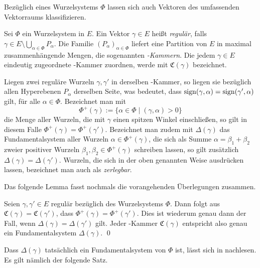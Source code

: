 Bezüglich eines Wurzelsystems $\Phi$ lassen sich auch Vektoren des umfassenden Vektorraums klassifizieren.

\begin{defn}
  Sei $\Phi$ ein Wurzelsystem in $E$.
  Ein Vektor $\gamma \in E$ heißt \emph{regulär}, falls $\gamma \in E \setminus \bigcup_{\alpha \in \Phi} P_\alpha$.
  Die Familie $(P_\alpha)_{\alpha \in \Phi}$ liefert eine Partition von $E$ in maximal zusammenhängende Mengen, die sogenannten \emph{\weyl\hyp{}Kammern}.
  Die jedem $\gamma \in E$ eindeutig zugeordnete \weyl\hyp{}Kammer zuordnen, werde mit $\mathfrak{C}(\gamma)$ bezeichnet.
\end{defn}

Liegen zwei reguläre Wurzeln $\gamma, \gamma'$ in derselben \weyl\hyp{}Kammer, so liegen sie bezüglich allen Hyperebenen $P_\alpha$ derselben Seite, was bedeutet, dass $\operatorname{sign} (\gamma, \alpha) = \operatorname{sign}( \gamma', \alpha)$ gilt, für alle $\alpha \in \Phi$.
Bezeichnet man mit
\begin{displaymath}
  \Phi^+(\gamma) := \{ \alpha \in \Phi \mid (\gamma, \alpha) > 0 \}
\end{displaymath}
die Menge aller Wurzeln, die mit $\gamma$ einen spitzen Winkel einschließen, so gilt in diesem Falle $\Phi^+(\gamma) = \Phi^+(\gamma')$.
Bezeichnet man zudem mit $\Delta(\gamma)$ das Fundamentalsystem aller Wurzeln $\alpha \in \Phi^+(\gamma)$, die sich als Summe $\alpha = \beta_1 + \beta_2$ zweier positiver Wurzeln $\beta_1, \beta_2 \in \Phi^+(\gamma)$ schreiben lassen, so gilt zusätzlich $\Delta(\gamma) = \Delta(\gamma')$. 
Wurzeln, die sich in der oben genannten Weise ausdrücken lassen, bezeichnet man auch als \emph{zerlegbar}.

Das folgende Lemma fasst nochmals die vorangehenden Überlegungen zusammen.

\begin{lem}
  Seien $\gamma, \gamma' \in E$ regulär bezüglich des Wurzelsystems $\Phi$.
  Dann folgt aus $\mathfrak{C}(\gamma) = \mathfrak{C}(\gamma')$, dass $\Phi^+(\gamma) = \Phi^+(\gamma')$. 
  Dies ist wiederum genau dann der Fall, wenn $\Delta(\gamma) = \Delta(\gamma')$ gilt.
  Jeder \weyl\hyp{}Kammer $\mathfrak{C}(\gamma)$ entspricht also genau ein Fundamentalsystem $\Delta(\gamma)$. \qed
\end{lem}

Dass $\Delta(\gamma)$ tatsächlich ein Fundamentalsystem von $\Phi$ ist, lässt sich in \cite[S.48]{humphreys1972introduction} nachlesen.
Es gilt nämlich der folgende Satz.

